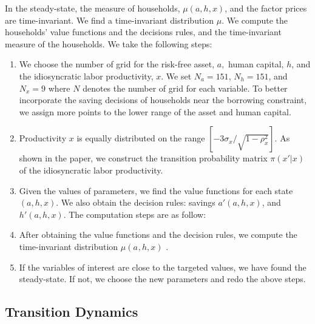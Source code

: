 \documentclass[12pt]{article}
\begin{document}
In the steady-state, the measure of households, $\mu(a,h,x)$, and
the factor prices are time-invariant. We find a time-invariant distribution
$\mu$. We compute the households' value functions and the decisions
rules, and the time-invariant measure of the households. We take the
following steps:
\begin{enumerate}
\item We choose the number of grid for the risk-free asset, $a,$ human
capital, $h$, and the idiosyncratic labor productivity, $x$. We
set $N_{a}=151$, $N_{h}=151$, and $N_{x}=9$ where $N$ denotes
the number of grid for each variable. To better incorporate the saving
decisions of households near the borrowing constraint, we assign more
points to the lower range of the asset and human capital. 
\item Productivity $x$ is equally distributed on the range $[-3\sigma_{x}/\sqrt{1-\rho_{x}^{2}}]$.
As shown in the paper, we construct the transition probability matrix
$\pi(x'|x)$ of the idiosyncratic labor productivity.
\item Given the values of parameters, we find the value functions for each
state $(a,h,x).$ We also obtain the decision rules: savings $a'(a,h,x)$,
and $h'(a,h,x)$. The computation steps are as follow:
\item After obtaining the value functions and the decision rules, we compute
the time-invariant distribution $\mu(a_{},h,x)$ .
\item If the variables of interest are close to the targeted values, we
have found the steady-state. If not, we choose the new parameters
and redo the above steps.
\end{enumerate}

\subsection{Transition Dynamics}
\end{document}
